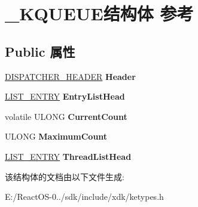 \hypertarget{struct___k_q_u_e_u_e}{}\section{\+\_\+\+K\+Q\+U\+E\+U\+E结构体 参考}
\label{struct___k_q_u_e_u_e}
\subsection*{Public 属性}
\begin{DoxyCompactItemize}
\item 
\mbox{\label{struct___k_q_u_e_u_e_a91e1790568dd37e28486e5c88ebea4b3}} 
\hyperlink{struct___d_i_s_p_a_t_c_h_e_r___h_e_a_d_e_r}{D\+I\+S\+P\+A\+T\+C\+H\+E\+R\+\_\+\+H\+E\+A\+D\+ER} {\bfseries Header}
\item 
\mbox{\label{struct___k_q_u_e_u_e_a2473a0a5d15111271bbec2f6efabffcb}} 
\hyperlink{struct___l_i_s_t___e_n_t_r_y}{L\+I\+S\+T\+\_\+\+E\+N\+T\+RY} {\bfseries Entry\+List\+Head}
\item 
\mbox{\label{struct___k_q_u_e_u_e_aee1daba080d3b18f278ebf313e7a2eda}} 
volatile U\+L\+O\+NG {\bfseries Current\+Count}
\item 
\mbox{\label{struct___k_q_u_e_u_e_a450b00f4f69be9128a9f1d266ef1f75f}} 
U\+L\+O\+NG {\bfseries Maximum\+Count}
\item 
\mbox{\label{struct___k_q_u_e_u_e_aa41ee1abd3ac059a0964e93069f5d9ae}} 
\hyperlink{struct___l_i_s_t___e_n_t_r_y}{L\+I\+S\+T\+\_\+\+E\+N\+T\+RY} {\bfseries Thread\+List\+Head}
\end{DoxyCompactItemize}


该结构体的文档由以下文件生成\+:\begin{DoxyCompactItemize}
\item 
E\+:/\+React\+O\+S-\/0../sdk/include/xdk/ketypes.\+h\end{DoxyCompactItemize}
